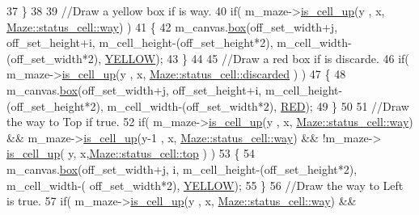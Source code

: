 \begin{DoxyCode}
37             \}
38 
39             \textcolor{comment}{//Draw a yellow box if is way.}
40             \textcolor{keywordflow}{if}( m\_maze->\hyperlink{classMaze_a2b0e69e72d6c3e1037578f057946a21e}{is\_cell\_up}(y , x, \hyperlink{classMaze_a07167e321eac2b67100fb82ecb98f1d1ac83b72dd001482ce10f0b106c7a0ed0e}{Maze::status\_cell::way}) )
41             \{
42                 m\_canvas.\hyperlink{classCanvas_a6e1c6baa6fb92cd3de1726b67b51aa38}{box}(off\_set\_width+j, off\_set\_height+i, m\_cell\_height-(off\_set\_height*2), 
      m\_cell\_width-(off\_set\_width*2), \hyperlink{render_8cpp_a0616d169807ac93a808a3928d058d2d5}{YELLOW});         
43             \}
44 
45             \textcolor{comment}{//Draw a red box if is discarde.}
46             \textcolor{keywordflow}{if}( m\_maze->\hyperlink{classMaze_a2b0e69e72d6c3e1037578f057946a21e}{is\_cell\_up}(y , x, \hyperlink{classMaze_a07167e321eac2b67100fb82ecb98f1d1a94708897ec9db8647dfe695714c98e46}{Maze::status\_cell::discarded}
      ) )
47             \{
48                 m\_canvas.\hyperlink{classCanvas_a6e1c6baa6fb92cd3de1726b67b51aa38}{box}(off\_set\_width+j, off\_set\_height+i, m\_cell\_height-(off\_set\_height*2), 
      m\_cell\_width-(off\_set\_width*2), \hyperlink{render_8cpp_a0db58550f21b0b45458ade7d071c3500}{RED});         
49             \}
50 
51             \textcolor{comment}{//Draw the way to Top if true.}
52             \textcolor{keywordflow}{if}( m\_maze->\hyperlink{classMaze_a2b0e69e72d6c3e1037578f057946a21e}{is\_cell\_up}(y , x, \hyperlink{classMaze_a07167e321eac2b67100fb82ecb98f1d1ac83b72dd001482ce10f0b106c7a0ed0e}{Maze::status\_cell::way}) &&  
      m\_maze->\hyperlink{classMaze_a2b0e69e72d6c3e1037578f057946a21e}{is\_cell\_up}(y-1 , x, \hyperlink{classMaze_a07167e321eac2b67100fb82ecb98f1d1ac83b72dd001482ce10f0b106c7a0ed0e}{Maze::status\_cell::way}) && !m\_maze->
      \hyperlink{classMaze_a2b0e69e72d6c3e1037578f057946a21e}{is\_cell\_up}( y, x,\hyperlink{classMaze_a07167e321eac2b67100fb82ecb98f1d1ab28354b543375bfa94dabaeda722927f}{Maze::status\_cell::top} ) )
53             \{
54                 m\_canvas.\hyperlink{classCanvas_a6e1c6baa6fb92cd3de1726b67b51aa38}{box}(off\_set\_width+j, i, m\_cell\_height-(off\_set\_height*2), m\_cell\_width-(
      off\_set\_width*2), \hyperlink{render_8cpp_a0616d169807ac93a808a3928d058d2d5}{YELLOW});         
55             \}
56             \textcolor{comment}{//Draw the way to Left is true.}
57             \textcolor{keywordflow}{if}( m\_maze->\hyperlink{classMaze_a2b0e69e72d6c3e1037578f057946a21e}{is\_cell\_up}(y , x, \hyperlink{classMaze_a07167e321eac2b67100fb82ecb98f1d1ac83b72dd001482ce10f0b106c7a0ed0e}{Maze::status\_cell::way}) &&  

\end{DoxyCode}

